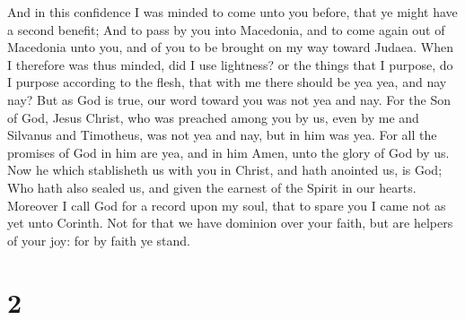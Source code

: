  And in this confidence I was minded to come unto you
before, that ye might have a second benefit;  And to pass
by you into Macedonia, and to come again out of Macedonia unto you, and
of you to be brought on my way toward Judaea.  When I
therefore was thus minded, did I use lightness? or the things that I
purpose, do I purpose according to the flesh, that with me there should
be yea yea, and nay nay?  But as God is true, our word
toward you was not yea and nay.  For the Son of God, Jesus
Christ, who was preached among you by us, even by me and Silvanus and
Timotheus, was not yea and nay, but in him was yea.  For
all the promises of God in him are yea, and in him Amen, unto the glory
of God by us.  Now he which stablisheth us with you in
Christ, and hath anointed us, is God;  Who hath also sealed
us, and given the earnest of the Spirit in our hearts. 
Moreover I call God for a record upon my soul, that to spare you I came
not as yet unto Corinth.  Not for that we have dominion
over your faith, but are helpers of your joy: for by faith ye stand.

\hypertarget{section-1}{%
\section{2}\label{section-1}}


